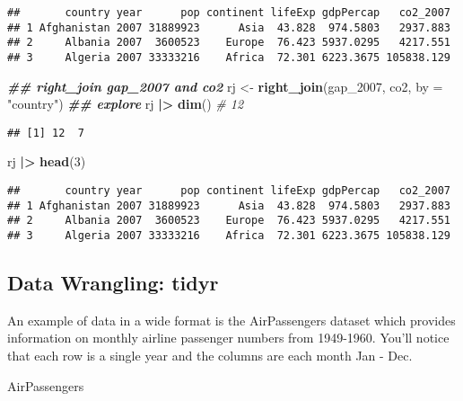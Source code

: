 \documentclass[
]{article}
\newenvironment{Shaded}{\begin{snugshade}}{\end{snugshade}}
\newcommand{\AttributeTok}[1]{\textcolor[rgb]{0.13,0.29,0.53}{#1}}
\newcommand{\CommentTok}[1]{\textcolor[rgb]{0.56,0.35,0.01}{\textit{#1}}}
\newcommand{\DecValTok}[1]{\textcolor[rgb]{0.00,0.00,0.81}{#1}}
\newcommand{\DocumentationTok}[1]{\textcolor[rgb]{0.56,0.35,0.01}{\textbf{\textit{#1}}}}
\newcommand{\FunctionTok}[1]{\textcolor[rgb]{0.13,0.29,0.53}{\textbf{#1}}}
\newcommand{\NormalTok}[1]{#1}
\newcommand{\OtherTok}[1]{\textcolor[rgb]{0.56,0.35,0.01}{#1}}
\newcommand{\SpecialCharTok}[1]{\textcolor[rgb]{0.81,0.36,0.00}{\textbf{#1}}}
\newcommand{\StringTok}[1]{\textcolor[rgb]{0.31,0.60,0.02}{#1}}
\begin{document}
\begin{verbatim}
##       country year      pop continent lifeExp gdpPercap   co2_2007
## 1 Afghanistan 2007 31889923      Asia  43.828  974.5803   2937.883
## 2     Albania 2007  3600523    Europe  76.423 5937.0295   4217.551
## 3     Algeria 2007 33333216    Africa  72.301 6223.3675 105838.129
\end{verbatim}

\begin{Shaded}
\begin{Highlighting}[]
\DocumentationTok{\#\# right\_join gap\_2007 and co2}
\NormalTok{rj }\OtherTok{\textless{}{-}} \FunctionTok{right\_join}\NormalTok{(gap\_2007, co2, }\AttributeTok{by =} \StringTok{"country"}\NormalTok{)}
\DocumentationTok{\#\# explore}
\NormalTok{rj }\SpecialCharTok{|\textgreater{}} \FunctionTok{dim}\NormalTok{() }\CommentTok{\# 12}
\end{Highlighting}
\end{Shaded}

\begin{verbatim}
## [1] 12  7
\end{verbatim}

\begin{Shaded}
\begin{Highlighting}[]
\NormalTok{rj }\SpecialCharTok{|\textgreater{}} \FunctionTok{head}\NormalTok{(}\DecValTok{3}\NormalTok{)}
\end{Highlighting}
\end{Shaded}

\begin{verbatim}
##       country year      pop continent lifeExp gdpPercap   co2_2007
## 1 Afghanistan 2007 31889923      Asia  43.828  974.5803   2937.883
## 2     Albania 2007  3600523    Europe  76.423 5937.0295   4217.551
## 3     Algeria 2007 33333216    Africa  72.301 6223.3675 105838.129
\end{verbatim}

\subsection{Data Wrangling: tidyr}\label{data-wrangling-tidyr}

An example of data in a wide format is the AirPassengers dataset which
provides information on monthly airline passenger numbers from
1949-1960. You'll notice that each row is a single year and the columns
are each month Jan - Dec.

\begin{Shaded}
\begin{Highlighting}[]
\NormalTok{AirPassengers}
\end{Highlighting}
\end{Shaded}
\end{document}
